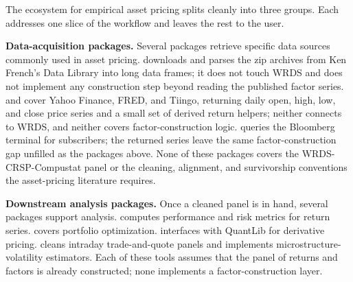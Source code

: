 \documentclass[
  article]{jss}
\newcounter{none} %
\begin{document}
The  ecosystem for empirical asset pricing splits cleanly
into three groups. Each addresses one slice of the workflow and leaves
the rest to the user.

\textbf{Data-acquisition packages.} Several  packages
retrieve specific data sources commonly used in asset pricing.
 \citep{frenchdata.2021} downloads and parses the zip
archives from Ken French's Data Library into long data frames; it does
not touch WRDS and does not implement any construction step beyond
reading the published factor series.  \citep{ryan.2025}
and  \citep{dancho.2026} cover Yahoo Finance, FRED, and
Tiingo, returning daily open, high, low, and close price series and a
small set of derived return helpers; neither connects to WRDS, and
neither covers factor-construction logic. 
\citep{armstrong.Rblpapi} queries the Bloomberg terminal for
subscribers; the returned series leave the same factor-construction gap
unfilled as the packages above. None of these packages covers the
WRDS-CRSP-Compustat panel or the cleaning, alignment, and survivorship
conventions the asset-pricing literature requires.

\textbf{Downstream analysis packages.} Once a cleaned panel is in hand,
several packages support analysis. 
\citep{peterson.2026} computes performance and risk metrics for return
series.  \citep{wuertz.fPortfolio} covers portfolio
optimization.  \citep{eddelbuettel.RQuantLib} interfaces
with QuantLib for derivative pricing. 
\citep{boudt.highfrequency} cleans intraday trade-and-quote panels and
implements microstructure-volatility estimators. Each of these tools
assumes that the panel of returns and factors is already constructed;
none implements a factor-construction layer.
\end{document}
